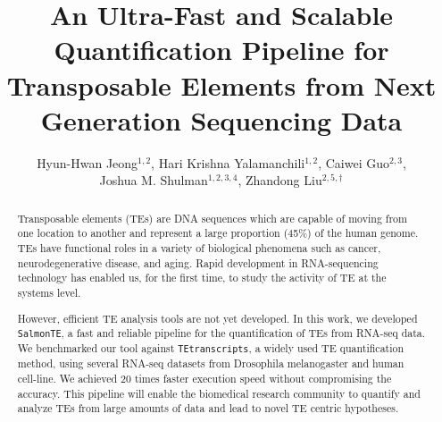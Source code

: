 \documentclass[wsdraft]{ws-procs11x85}
\newcommand{\TEtranscripts}{\texttt{TEtranscripts}}
\newcommand{\SalmonTE}{\texttt{SalmonTE}}
\begin{document}
\title{An Ultra-Fast and Scalable Quantification Pipeline for Transposable Elements from Next Generation Sequencing Data}

\author{Hyun-Hwan Jeong$^{1,2}$, Hari Krishna Yalamanchili$^{1,2}$, Caiwei Guo$^{2,3}$, \\
Joshua M. Shulman$^{1,2,3,4}$, Zhandong Liu$^{2,5,\dag}$}

\address{$^{1}$Department of Molecular and Human Genetics, Baylor College of Medicine,\\
$^{2}$Jan and Dan Duncan Neurological Research Institute, Texas Children’s Hospital,\\
$^{3}$Department of Neuroscience, Baylor College of Medicine,\\
$^{4}$Department of Neurology, Baylor College of Medicine,\\
$^{5}$Department of Pediatrics, Baylor College of Medicine,\\
Houston, Texas 77030, USA\\
$^{\dag}$E-mail: zhandonl@bcm.edu}

\begin{abstract}

Transposable elements (TEs) are DNA sequences which are capable of moving from one location to another and represent a large proportion (45\%) of the human genome. 
TEs have functional roles in a variety of biological phenomena such as cancer,
neurodegenerative disease, and aging.
Rapid development in RNA-sequencing technology has enabled us, for the first time, to study the activity of TE at the systems level.  


However, efficient TE analysis tools are not yet developed.
In this work, we developed \SalmonTE, a fast and reliable pipeline for the quantification of TEs from 
RNA-seq data.
We benchmarked our tool against \TEtranscripts, a widely used TE quantification method, using several RNA-seq datasets from
Drosophila melanogaster and human cell-line.
We achieved 20 times faster execution speed without compromising the accuracy.
This pipeline will enable the biomedical research community to quantify and analyze TEs from large amounts of data and lead to novel TE centric hypotheses.


\end{abstract}


\end{document}
